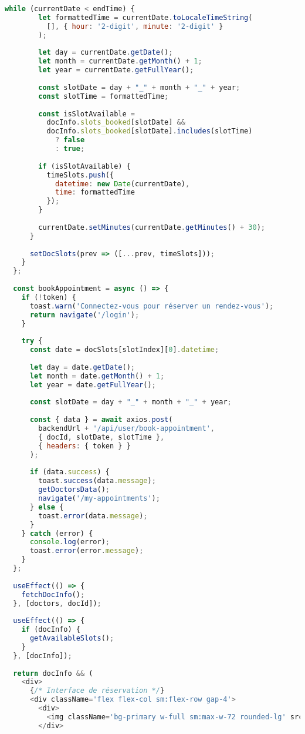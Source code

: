 \begin{lstlisting}[language=JavaScript, caption=Composant de réservation]
      while (currentDate < endTime) {
        let formattedTime = currentDate.toLocaleTimeString(
          [], { hour: '2-digit', minute: '2-digit' }
        );
        
        let day = currentDate.getDate();
        let month = currentDate.getMonth() + 1;
        let year = currentDate.getFullYear();
        
        const slotDate = day + "_" + month + "_" + year;
        const slotTime = formattedTime;
        
        const isSlotAvailable = 
          docInfo.slots_booked[slotDate] && 
          docInfo.slots_booked[slotDate].includes(slotTime) 
            ? false 
            : true;
        
        if (isSlotAvailable) {
          timeSlots.push({
            datetime: new Date(currentDate),
            time: formattedTime
          });
        }
        
        currentDate.setMinutes(currentDate.getMinutes() + 30);
      }
      
      setDocSlots(prev => ([...prev, timeSlots]));
    }
  };
  
  const bookAppointment = async () => {
    if (!token) {
      toast.warn('Connectez-vous pour réserver un rendez-vous');
      return navigate('/login');
    }
    
    try {
      const date = docSlots[slotIndex][0].datetime;
      
      let day = date.getDate();
      let month = date.getMonth() + 1;
      let year = date.getFullYear();
      
      const slotDate = day + "_" + month + "_" + year;
      
      const { data } = await axios.post(
        backendUrl + '/api/user/book-appointment', 
        { docId, slotDate, slotTime }, 
        { headers: { token } }
      );
      
      if (data.success) {
        toast.success(data.message);
        getDoctorsData();
        navigate('/my-appointments');
      } else {
        toast.error(data.message);
      }
    } catch (error) {
      console.log(error);
      toast.error(error.message);
    }
  };
  
  useEffect(() => {
    fetchDocInfo();
  }, [doctors, docId]);
  
  useEffect(() => {
    if (docInfo) {
      getAvailableSlots();
    }
  }, [docInfo]);
  
  return docInfo && (
    <div>
      {/* Interface de réservation */}
      <div className='flex flex-col sm:flex-row gap-4'>
        <div>
          <img className='bg-primary w-full sm:max-w-72 rounded-lg' src={docInfo.image} alt="" />
        </div>
        

\end{lstlisting}
